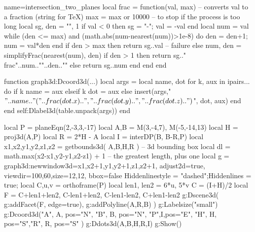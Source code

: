 \documentclass[12pt]{standalone}%
\begin{document}
\begin{luadraw}{name=intersection_two_planes}
local frac = function(val, max)  -- converts val to a fraction (string for TeX)
    max = max or 10000 -- to stop if the process is too long
    local sg, den =  "", 1
    if val < 0 then sg = "-"; val = -val end
    local num = val
    while (den <= max) and (math.abs(num-nearest(num))>1e-8) do den = den+1; num = val*den end
    if den > max then 
        return sg..val -- failure
    else
        num, den = simplifyFrac(nearest(num), den)
        if den > 1 then 
            return sg.."\\frac{"..num.."}{"..den.."}"
        else
            return sg..num
        end
    end
end

function graph3d:Dcoord3d(...)
    local args = {}
    local name, dot
    for k, aux in ipairs{...} do
        if k%
            name = aux
        elseif k%
            dot = aux
        else
            insert(args,{"$"..name.."("..frac(dot.x)..","..frac(dot.y)..","..frac(dot.z)..")$", dot, aux})
        end
    end
    self:Dlabel3d(table.unpack(args))
end

local P = planeEqn(2,-3,3,-17)
local A,B = M(3,-4,7), M(-5,-14,13)
local H = proj3d(A,P)
local R = 2*H - A
local I = interDP({B, B-R},P)
local x1,x2,y1,y2,z1,z2 = getbounds3d( {A,B,H,R} ) -- 3d bounding box
local dl = math.max(x2-x1,y2-y1,z2-z1) + 1 -- the greatest length, plus one
local g = graph3d:new{window3d={x1,x2+1,y1,y2+1,z1,z2+1}, adjust2d=true, viewdir={100,60},size={12,12}, bbox=false}
Hiddenlinestyle = "dashed";Hiddenlines = true;
local C,u,v = orthoframe(P)
local len1, len2 = 6*u, 5*v
C = (I+H)/2
local F = {C+len1+len2, C-len1+len2, C-len1-len2, C+len1-len2}
g:Dscene3d(
    g:addFacet(F, {edge=true}),
    g:addPolyline({{A,R,B}})
)
g:Labelsize("small")
g:Dcoord3d("A", A, {pos="N"}, "B", B, {pos="N"}, "P",I,{pos="E"}, "H", H, {pos="S"},"R", R, {pos="S"} )
g:Ddots3d({A,B,H,R,I})
g:Show()
\end{luadraw} 
\end{document}

